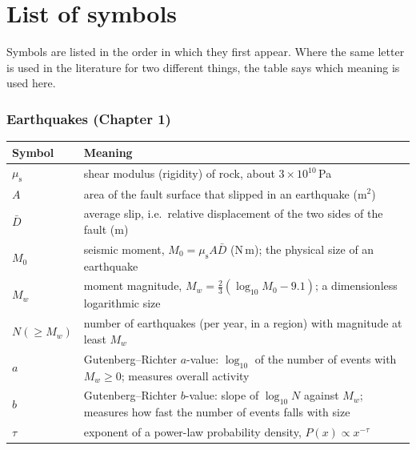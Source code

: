 \chapter*{List of symbols}

Symbols are listed in the order in which they first appear. Where the same letter is
used in the literature for two different things, the table says which meaning is used here.

\subsection*{Earthquakes (Chapter 1)}
\begin{longtable}{@{}p{22mm}p{120mm}@{}}
\toprule
Symbol & Meaning \\
\midrule
$\mu_{\mathrm s}$ & shear modulus (rigidity) of rock, about $3\times10^{10}$\,Pa \\
$A$ & area of the fault surface that slipped in an earthquake (m$^2$) \\
$\bar D$ & average slip, i.e.\ relative displacement of the two sides of the fault (m) \\
$M_0$ & seismic moment, $M_0=\mu_{\mathrm s} A\bar D$ (N\,m); the physical size of an earthquake \\
$M_w$ & moment magnitude, $M_w=\tfrac23(\log_{10}M_0-9.1)$; a dimensionless logarithmic size \\
$N(\geq M_w)$ & number of earthquakes (per year, in a region) with magnitude at least $M_w$ \\
$a$ & Gutenberg--Richter $a$-value: $\log_{10}$ of the number of events with $M_w\ge 0$; measures overall activity \\
$b$ & Gutenberg--Richter $b$-value: slope of $\log_{10}N$ against $M_w$; measures how fast the number of events falls with size \\
$\tau$ & exponent of a power-law probability density, $P(x)\propto x^{-\tau}$ \\
\bottomrule
\end{longtable}

